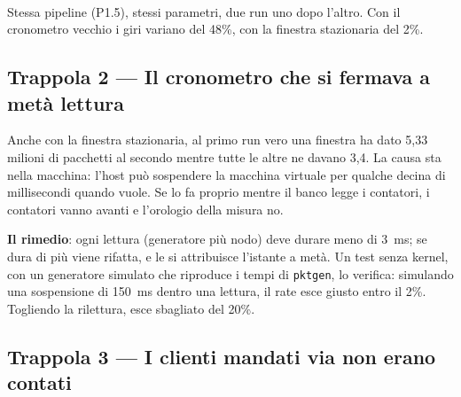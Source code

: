 \documentclass[11pt,a4paper,oneside]{report}
\begin{document}
\begin{center}
\\[-2pt]
{\footnotesize\color{soft} Stessa pipeline (P1.5), stessi parametri, due run uno dopo l'altro. Con il cronometro
vecchio i giri variano del 48\%, con la finestra stazionaria del 2\%.}
\end{center}

\subsection*{Trappola 2 --- Il cronometro che si fermava a metà lettura}

Anche con la finestra stazionaria, al primo run vero una finestra ha dato 5,33
milioni di pacchetti al secondo mentre tutte le altre ne davano 3,4. La causa
sta nella macchina: l'host può sospendere la macchina virtuale per qualche
decina di millisecondi quando vuole. Se lo fa proprio mentre il banco legge i
contatori, i contatori vanno avanti e l'orologio della misura no.

\textbf{Il rimedio}: ogni lettura (generatore più nodo) deve durare meno di
3~ms; se dura di più viene rifatta, e le si attribuisce l'istante a metà. Un
test senza kernel, con un generatore simulato che riproduce i tempi di
\texttt{pktgen}, lo verifica: simulando una sospensione di 150~ms dentro una
lettura, il rate esce giusto entro il 2\%. Togliendo la rilettura, esce sbagliato
del 20\%.

\subsection*{Trappola 3 --- I clienti mandati via non erano contati}
\end{document}
